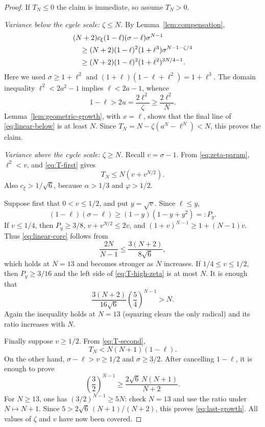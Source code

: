 \documentclass[11pt]{article}
\begin{document}
\begin{proof}
If $T_N\le0$ the claim is immediate, so assume $T_N>0$.

\smallskip
\noindent\emph{Variance below the cycle scale: $\zeta\le N$.}
By Lemma~\ref{lem:compensation},
\begin{align}
 &(N+2)c_\xi(1-\ell)(\sigma-\ell)\sigma^{N-1}\notag\\
 &\quad\ge
 (N+2)(1-\ell)^2(1+\ell^3)
 \sigma^{N-1-\zeta/4}\notag\\
 &\quad\ge
 (N+2)(1-\ell)^2(1+\ell^2)^{3N/4-1}.
 \label{eq:linear-below}
\end{align}
Here we used $\sigma\ge1+\ell^2$ and
$(1+\ell)(1-\ell+\ell^2)=1+\ell^3$.
The domain inequality $\ell^2<2a^2-1$ implies
$\ell<2a-1$, whence
\[
 1-\ell>2u=\frac{2\ell^2}{\zeta}
 \ge\frac{2\ell^2}{N}.
\]
Lemma~\ref{lem:geometric-growth}, with $x=\ell$, shows that the final
line of \eqref{eq:linear-below} is at least $N$.  Since
$T_N=N-\zeta(a^N-\ell^N)<N$, this proves the claim.

\smallskip
\noindent\emph{Variance above the cycle scale: $\zeta\ge N$.}
Recall $v=\sigma-1$.  From \eqref{eq:zeta-param},
$\ell^2<v$, and \eqref{eq:T-first} gives
\begin{equation}\label{eq:T-high-zeta}
        T_N\le N(v+v^{N/2}).
\end{equation}
Also $c_\xi>1/\sqrt6$, because $\alpha>1/3$ and $\varphi>1/2$.

Suppose first that $0<v\le1/2$, and put $y=\sqrt v$.  Since
$\ell\le y$,
\begin{equation}\label{eq:Py}
        (1-\ell)(\sigma-\ell)
        \ge(1-y)(1-y+y^2)=:P_y.
\end{equation}
If $v\le1/4$, then $P_y\ge3/8$,
$v+v^{N/2}\le2v$, and
$(1+v)^{N-1}\ge1+(N-1)v$.  Thus \eqref{eq:linear-core} follows from
\[
        \frac{2N}{N-1}\le\frac{3(N+2)}{8\sqrt6},
\]
which holds at $N=13$ and becomes stronger as $N$ increases.
If $1/4\le v\le1/2$, then $P_y\ge3/16$ and the left side of
\eqref{eq:T-high-zeta} is at most $N$.  It is enough that
\[
        \frac{3(N+2)}{16\sqrt6}
        \left(\frac54\right)^{N-1}>N.
\]
Again the inequality holds at $N=13$ (squaring clears the only radical) and
its ratio increases with $N$.

Finally suppose $v\ge1/2$.  From \eqref{eq:T-second},
\[
        T_N<N(N+1)(1-\ell).
\]
On the other hand, $\sigma-\ell>v\ge1/2$ and $\sigma\ge3/2$.
After cancelling $1-\ell$, it is enough to prove
\begin{equation}\label{eq:last-growth}
        \left(\frac32\right)^{N-1}
        \ge\frac{2\sqrt6\,N(N+1)}{N+2}.
\end{equation}
For $N\ge13$, one has $(3/2)^{N-1}\ge5N$: check $N=13$ and use the
ratio under $N\mapsto N+1$.  Since
$5>2\sqrt6\,(N+1)/(N+2)$, this proves
\eqref{eq:last-growth}.  All values of $\zeta$ and $v$ have now been
covered.
\end{proof}
\end{document}
